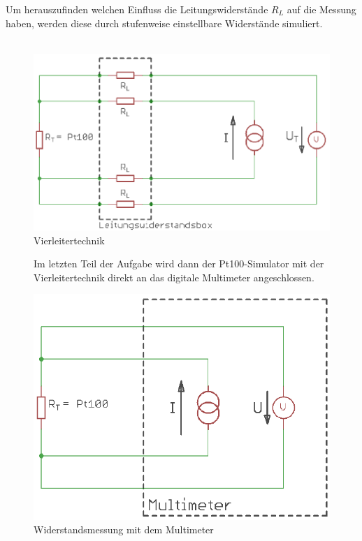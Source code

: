 \documentclass[a4paper,11pt,oneside]{article}
\begin{document}
\newpage

Um herauszufinden welchen Einfluss die Leitungswiderstände $R_L$ auf die Messung haben, werden diese durch stufenweise einstellbare Widerstände simuliert. \\\\
\vspace{1cm}
\begin{figure}[h]
\centering
\includegraphics[scale=0.5]{Bilder/4Leitertechnik.png}
\caption{Vierleitertechnik}
\end{figure}

\begin{figure}[h]
Im letzten Teil der Aufgabe wird dann der Pt100-Simulator mit der Vierleitertechnik direkt an das digitale Multimeter angeschlossen.\\
\end{figure}

\begin{figure}[h]
\centering
\includegraphics[scale=0.4]{Bilder/4LTDIMM.png}
\caption{Widerstandsmessung mit dem Multimeter}
\end{figure}
\end{document}
